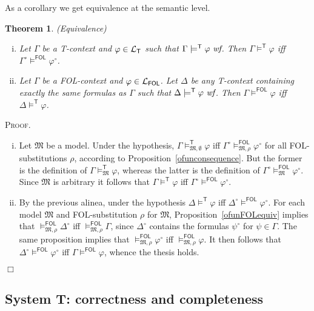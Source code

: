 \documentclass{article}
\newtheorem{theorem}[definition]{Theorem}
\newenvironment{proof}{\smallskip\textsc{Proof.}}{\hspace*{\fill}$\Box$}
\newcommand{\T}{\textsf T}
\newcommand{\FOL}{\textsf{FOL}}
\newcommand{\ofun}[1]{\ensuremath{{#1}^\circ}}
\newcommand{\wf}{\ \mbox{\em wf}}
\newcommand{\lang}[1]{\ensuremath{{\cal L}_{\mathsf{#1}}}}
\newcommand{\mymodelsm}[2]{\ensuremath{\models_{\mathfrak{#2}}^{\mathsf{#1}}}}
\newcommand{\mymodelss}[3]{\ensuremath{\models_{\mathfrak{#2},{#3}}^{\mathsf{#1}}}}
\newcommand{\yields}[1]{\ensuremath{\models^{\mathsf{#1}}}}
\begin{document}
\bigskip\noindent
As a corollary we get equivalence at the semantic level.
\begin{theorem}\label{TequivFOLsem}
\emph{(Equivalence)}
\begin{enumerate}[(i)]
\item Let $\Gamma$ be a {\T}-context and $\varphi\in\lang{T}$ such that
$\Gamma\yields{T}\varphi\wf$.  Then
$\Gamma\yields{T}\varphi$ iff $\ofun\Gamma\yields{FOL}\ofun\varphi$.
\item Let $\Gamma$ be a {\FOL}-context and $\varphi\in\lang{FOL}$.
Let $\Delta$ be any {\T}-context containing exactly the same formulas
as $\Gamma$ such that $\Delta\yields{T}\varphi\wf$.  Then
$\Gamma\yields{FOL}\varphi$ iff $\Delta\yields{T}\varphi$.
\end{enumerate}
\end{theorem}
\begin{proof}
\begin{enumerate}[(i)]
\item Let $\mathfrak M$ be a model.  Under the hypothesis, 
$\Gamma\mymodelss{T}M\emptyset\varphi$ iff
$\ofun\Gamma\mymodelss{FOL}M\rho\ofun\varphi$ for all {\FOL}-substitutions
$\rho$, according to Proposition~\ref{ofunconsequence}.  But the former is
the definition of $\Gamma\mymodelsm{T}M\varphi$, whereas the latter is
the definition of $\ofun\Gamma\mymodelsm{FOL}M\ofun\varphi$.
Since $\mathfrak M$ is arbitrary it follows that 
$\Gamma\yields{T}\varphi$ iff $\ofun\Gamma\yields{FOL}\ofun\varphi$.
\item By the previous alinea, under the hypothesis
$\Delta\yields{T}\varphi$ iff $\ofun\Delta\yields{FOL}\ofun\varphi$.
For each model $\mathfrak M$ and {\FOL}-substitution $\rho$ for $\mathfrak M$,
Proposition~\ref{ofunFOLequiv} implies that $\mymodelss{FOL}M\rho\ofun\Delta$
iff $\mymodelss{FOL}M\rho\Gamma$, since $\ofun\Delta$ contains the formulas
$\ofun\psi$ for $\psi\in\Gamma$.  The same proposition implies that
$\mymodelss{FOL}M\rho\ofun\varphi$ iff $\mymodelss{FOL}M\rho\varphi$.
It then follows that $\ofun\Delta\yields{FOL}\ofun\varphi$ iff
$\Gamma\yields{FOL}\varphi$, whence the thesis holds.
\end{enumerate}
\end{proof}

\subsection{System {\T}: correctness and completeness}
\end{document}
